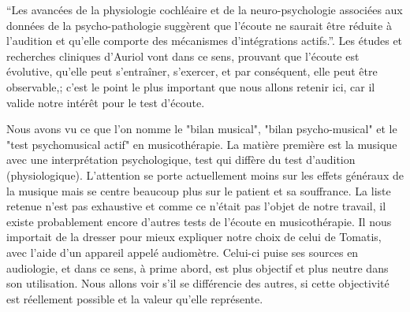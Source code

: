 \enquote {Les avancées de la physiologie cochléaire et de la neuro-psychologie associées aux données 
de la psycho-pathologie suggèrent que l'écoute ne saurait être réduite à l'audition et qu'elle comporte 
des mécanismes d'intégrations actifs.}\autocite[p.58]{auriol:cle}. Les études et recherches cliniques 
d'Auriol vont dans ce sens, prouvant que l'écoute est évolutive, qu'elle peut  s'entraîner, s'exercer, et par 
conséquent, elle peut être observable,;  
c'est le point le plus important que nous allons retenir ici,  car il valide notre intérêt pour le test 
d'écoute. %

Nous avons vu ce que l'on nomme le "bilan musical", "bilan psycho-musical" et le  "test psychomusical actif" en musicothérapie. La matière première est la musique avec une interprétation psychologique, test qui diffère du test d'audition (physiologique). L'attention se porte actuellement moins sur les effets généraux de la musique  mais se centre beaucoup plus sur le patient et sa souffrance.
La liste retenue n'est pas exhaustive et comme ce n'était pas l'objet de notre travail, il existe probablement encore d'autres tests de l'écoute en musicothérapie.
Il nous importait de la dresser pour mieux expliquer notre choix de celui de  Tomatis, avec l'aide d'un 
appareil appelé audiomètre. Celui-ci  puise ses sources en audiologie, et dans ce sens, à prime abord, 
est plus objectif et plus neutre dans son utilisation. Nous allons voir s'il se différencie des autres, si cette 
objectivité est réellement possible et la valeur qu'elle représente.



